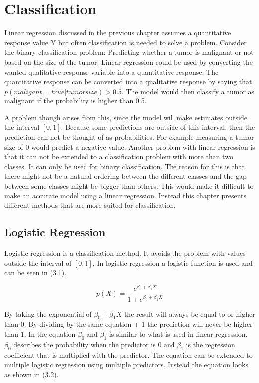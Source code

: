 \chapter{Classification}
Linear regression discussed in the previous chapter assumes a quantitative response value Y but often classification is needed to solve a problem. Consider the binary classification problem: Predicting whether a tumor is malignant or not based on the size of the tumor. Linear regression could be used by converting the wanted qualitative response variable into a quantitative response. The quantitative response can be converted into a qualitative response by saying that $p(maligant = true | tumorsize) > 0.5$. The model would then classify a tumor as malignant if the probability is higher than 0.5. 

A problem though arises from this, since the model will make estimates outside the interval $[0,1]$. Because some predictions are outside of this interval, then the prediction can not be thought of as probabilities. For example measuring a tumor size of 0 would predict a negative value. Another problem with linear regression is that it can not be extended to a classification problem with more than two classes. It can only be used for binary classification. The reason for this is that there might not be a natural ordering between the different classes and the gap between some classes might be bigger than others. This would make it difficult to make an accurate model using a linear regression. Instead this chapter presents different methods that are more suited for classification.

\section{Logistic Regression}
\label{chp:logreg}
Logistic regression is a classification method. It avoids the problem with values outside the interval of $[0,1]$. In logistic regression a logistic function is used and can be seen in (3.1).

\begin{equation}
	p(X) = \dfrac{e^{\beta_0 + \beta_1 X}}{1 + e^{\beta_0 + \beta_1 X}}
\end{equation}

By taking the exponential of $\beta_0 + \beta_1 X$ the result will always be equal to or higher than 0. By dividing by the same equation + 1 the prediction will never be higher than 1. In the equation $\beta_0$ and $\beta_1$ is similar to what is used in linear regression. $\beta_0$ describes the probability when the predictor is 0 and $\beta_1$ is the regression coefficient that is multiplied  with the predictor. The equation can be extended to multiple logistic regression using multiple predictors. Instead the equation looks as shown in (3.2).

